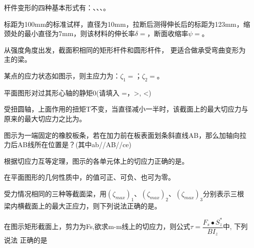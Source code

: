 \documentclass[prescorebox,contitemcnt,answers]{nwsuafexam}%
\begin{document}
	\begin{questions}
		\question
	    杆件变形的四种基本形式有：、、、。
		
		\question
		标距为100mm的标准试样，直径为10mm，拉断后测得伸长后的标距为123mm，缩颈处的最小直径为7mm，则该材料的伸长率$\delta=$，断面收缩率$\psi=$。
		
		\question
		从强度角度出发，截面积相同的矩形杆件和圆形杆件， 更适合做承受弯曲变形为主的梁。
		
		\question
		某点的应力状态如图示，则主应力为：$\zeta_1=$；$\zeta_2=$。
		
		\question
		平面图形对过其形心轴的静矩\blank{=}0(请填入 =，>, <)
		
		\question
		受扭圆轴，上面作用的扭矩T不变，当直径减小一半时，该截面上的最大切应力与原来的最大切应力之比为\selectline。
		
		\question
		图示为一端固定的橡胶板条，若在加力前在板表面划条斜直线AB，那么加轴向拉力后AB线所在位置是\selectline ？(其中ab//AB//ce)
		
		\question
		根据切应力互等定理，图示的各单元体上的切应力正确的是\selectline。
		
		\question
		在平面图形的几何性质中，\selectline 的值可正、可负、也可为零。 
		
		\question
		受力情况相同的三种等截面梁，用$(\zeta_{max})_1$、$(\zeta_{max})_2$、$(\zeta_{max})_3$分别表示三根梁内横截面上的最大正应力，则下列说法正确的是\selectline。 
		
		\question
		在图示矩形截面上，剪力为Fs,欲求m-m线上的切应力，则公式$\tau=\dfrac{F_s\bullet S^*_z}{BI_z}$中, 下列说法 正确的是\selectline {}
		

\end{questions}
\end{document}
